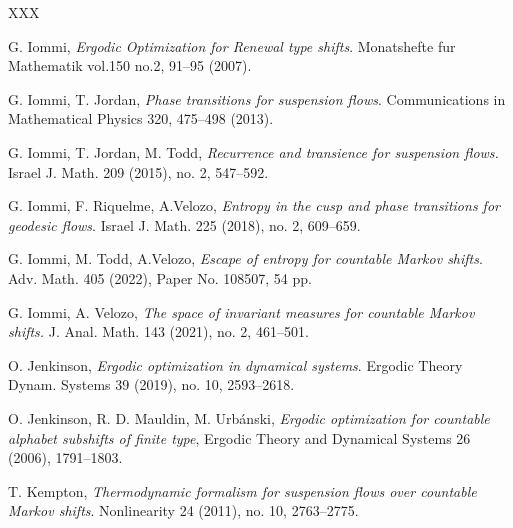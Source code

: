\documentclass[letterpaper,11pt]{amsart}
\theoremstyle{plain}
\theoremstyle{plain}
\theoremstyle{definition}
\theoremstyle{remark}
\begin{document}
\begin{thebibliography}{XXX}

 G. Iommi, \emph{Ergodic Optimization for Renewal type shifts}.  Monatshefte fur Mathematik vol.150 no.2, 91--95 (2007).


 G. Iommi, T. Jordan, \emph{Phase transitions for suspension flows}. Communications in Mathematical Physics 320, 475--498 (2013).

 G. Iommi, T. Jordan, M. Todd, \emph{Recurrence and transience for suspension flows.} Israel J. Math. 209 (2015), no. 2, 547--592.

 G. Iommi, F. Riquelme, A.Velozo, \emph{Entropy in the cusp and phase transitions for geodesic flows}. Israel J. Math. 225 (2018), no. 2, 609--659.


 G. Iommi, M. Todd, A.Velozo, \emph{Escape of entropy for countable Markov shifts}. Adv. Math. 405 (2022), Paper No. 108507, 54 pp.
 
 G. Iommi, A. Velozo, \emph{The space of invariant measures for countable Markov shifts.} J. Anal. Math. 143 (2021), no. 2, 461--501.

 O. Jenkinson, \emph{Ergodic optimization in dynamical systems}. Ergodic Theory Dynam. Systems 39 (2019), no. 10, 2593--2618.


 O. Jenkinson, R. D.  Mauldin,  M. Urb\'anski, \emph{Ergodic optimization for countable alphabet subshifts of finite type}, Ergodic Theory and Dynamical Systems 26 (2006), 1791--1803.


 T. Kempton, \emph{Thermodynamic formalism for suspension flows over countable Markov shifts}. Nonlinearity 24 (2011), no. 10, 2763--2775. 


 


\end{thebibliography}
\end{document}
